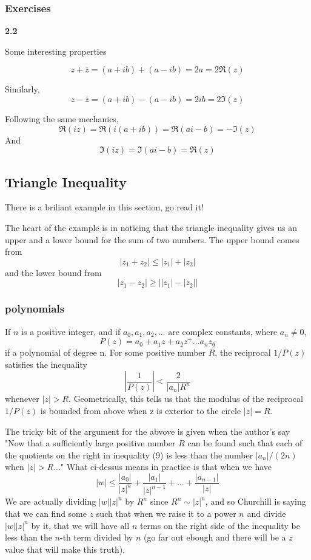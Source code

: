 \subsubsection{Exercises}

\textbf{2.2}

Some interesting properties

$$
z + \bar{z} = (a+ib) + (a-ib) = 2a = 2\Re (z)
$$

Similarly,
$$
z - \bar{z} = (a+ib) - (a-ib) = 2ib = 2\Im (z)
$$

Following the same mechanics,
$$
\Re (iz) = \Re (i(a+ib)) = \Re (ai-b) = -\Im (z)
$$
And
$$
\Im (iz) = \Im (ai -b) = \Re (z)
$$


\subsection{Triangle Inequality}

There is a briliant example in this section, go read it!

The heart of the example is in noticing that the triangle inequality gives us an upper and a lower
bound for the sum of two numbers.
The upper bound comes from
$$
|z_1 + z_2| \leq |z_1| + |z_2|
$$
and the lower bound from
$$
|z_1 - z_2| \geq \left| |z_1| - |z_2| \right|
$$

\subsubsection{polynomials}

If $n$ is a positive integer, and if $a_0, a_1, a_2, \ldots$ are complex constants,
where $a_n \neq 0$,
$$
P(z) = a_0 + a_1 z + a_2 z^ + \ldots a_n z_6
$$
if a polynomial of degree n.
For some positive number $R$, the reciprocal $1/P(z)$ satisfies the inequality
$$
\left| \frac{1}{P(z)} \right| < \frac{2}{|a_n| R^n}
$$
whenever $|z| > R$.
Geometrically, this tells us that the modulus of the reciprocal $1/P(z)$
is bounded from above when z is exterior to the circle $|z| = R$.

The tricky bit of the argument for the abvove is given when the author's say
"Now that a sufficiently large positive number $R$ can be found such that each of the
quotients on the right in inequality (9) is less than the number $|a_n |/(2n)$ when
$|z| > R$..."
What ci-dessus means in practice is that when we have
$$
|w| \leq \frac{|a_0|}{|z|^n} + \frac{|a_1|}{|z|^{n-1}} + \ldots + \frac{|a_{n-1}|}{|z|}
$$
We are actually dividing $|w||z|^n$ by $R^n$ since $R^n \sim |z|^n$, and so Churchill
is saying that we can find some $z$ such that when we raise it to a power $n$ and divide $|w||z|^n$
by it, that we will have all $n$ terms on the right side of the inequality be less than the $n$-th
term divided by $n$ (go far out ebough and there will be a $z$ value that will make this truth).

